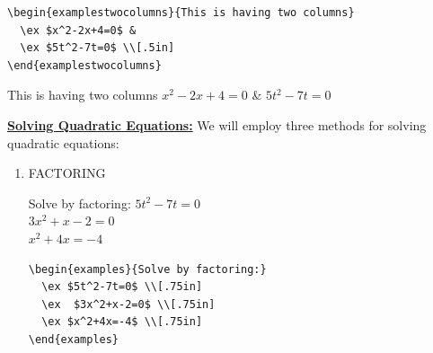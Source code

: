 \begin{verbatim}
\begin{examplestwocolumns}{This is having two columns}
  \ex $x^2-2x+4=0$ &
  \ex $5t^2-7t=0$ \\[.5in]
\end{examplestwocolumns}
\end{verbatim}
\begin{examplestwocolumns}{This is having two columns}
  \ex $x^2-2x+4=0$ &
  \ex $5t^2-7t=0$ \\[.5in]
\end{examplestwocolumns}

\noindent \underline{\textbf{Solving Quadratic Equations:}} 
We will employ three methods for solving quadratic equations:
\begin{enumerate}
\item FACTORING
\begin{examples}{Solve by factoring:}
  \ex $5t^2-7t=0$ \\[.75in]
  \ex  $3x^2+x-2=0$ \\[.75in]
  \ex $x^2+4x=-4$ \\[.75in]
\end{examples}
\begin{verbatim}
\begin{examples}{Solve by factoring:}
  \ex $5t^2-7t=0$ \\[.75in]
  \ex  $3x^2+x-2=0$ \\[.75in]
  \ex $x^2+4x=-4$ \\[.75in]
\end{examples}
\end{verbatim}




 \end{enumerate}

